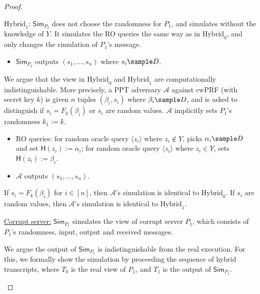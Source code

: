 \documentclass[a4paper,10pt]{article}
\begin{document}
\begin{proof}
\begin{trivlist}
\begin{center}
\end{center}

\item $\text{Hybrid}_1$: $\mathsf{Sim}_{P_2}$ does not choose the randomness for $P_1$, 
    and simulates without the knowledge of $Y$. 
    It simulates the RO queries the same way as in $\text{Hybrid}_0$, 
    and only changes the simulation of $P_1$'s message.  
\begin{itemize}
    \item $\mathsf{Sim}_{P_2}$ outputs $(s_1, \dots, s_n)$ where $s_i \sample D$.       
\end{itemize}
We argue that the view in $\text{Hybrid}_0$ and $\text{Hybrid}_1$ are computationally indistinguishable. 
More precisely, a PPT adversary $\mathcal{A}$  
against cwPRF (with secret key $k$) is given $n$ tuples $(\beta_i, s_i)$ where $\beta_i \sample D$, 
and is asked to distinguish if $s_i = F_k(\beta_i)$ or $s_i$ are random values. 
$\mathcal{A}$ implicitly sets $P_1$'s randomness $k_1:=k$. 
\begin{itemize}
    \item RO queries: for random oracle query $\langle z_i \rangle$ where $z_i \notin Y$,  
        picks $\alpha_i \sample D$ and set $\mathsf{H}(z_i):=\alpha_i$; 
        for random oracle query $\langle z_i \rangle$ where $z_i \in Y$, 
        sets $\mathsf{H}(z_i):=\beta_i$.  

    \item $\mathcal{A}$ outputs $(s_1, \dots, s_n)$.      
\end{itemize}

If $s_i = F_k(\beta_i)$ for $i \in [n]$, then $\mathcal{A}$'s simulation is identical to $\text{Hybrid}_0$. 
If $s_i$ are random values, then $\mathcal{A}$'s simulation is identical to $\text{Hybrid}_1$. 
\end{trivlist}

\begin{trivlist}
\item \underline{Corrupt server:} $\mathsf{Sim}_{P_1}$ simulates the view of corrupt server $P_1$, 
    which consists of $P_1$'s randomness, input, output and received messages.
 
    We argue the output of $\mathsf{Sim}_{P_1}$ is indistinguishable from the real execution. 
    For this, we formally show the simulation by proceeding the sequence of hybrid transcripts, 
    where $T_0$ is the real view of $P_1$, and $T_1$ is the output of $\mathsf{Sim}_{P_1}$. 


\end{trivlist}
\end{proof}
\end{document}
